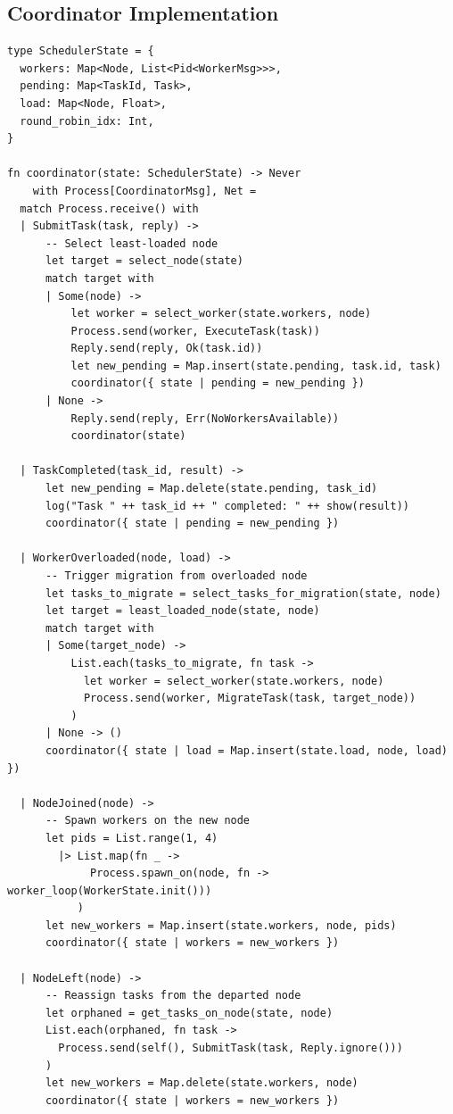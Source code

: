 \documentclass[11pt,a4paper]{article}
\begin{document}
\subsection{Coordinator Implementation}

\begin{lstlisting}
type SchedulerState = {
  workers: Map<Node, List<Pid<WorkerMsg>>>,
  pending: Map<TaskId, Task>,
  load: Map<Node, Float>,
  round_robin_idx: Int,
}

fn coordinator(state: SchedulerState) -> Never
    with Process[CoordinatorMsg], Net =
  match Process.receive() with
  | SubmitTask(task, reply) ->
      -- Select least-loaded node
      let target = select_node(state)
      match target with
      | Some(node) ->
          let worker = select_worker(state.workers, node)
          Process.send(worker, ExecuteTask(task))
          Reply.send(reply, Ok(task.id))
          let new_pending = Map.insert(state.pending, task.id, task)
          coordinator({ state | pending = new_pending })
      | None ->
          Reply.send(reply, Err(NoWorkersAvailable))
          coordinator(state)

  | TaskCompleted(task_id, result) ->
      let new_pending = Map.delete(state.pending, task_id)
      log("Task " ++ task_id ++ " completed: " ++ show(result))
      coordinator({ state | pending = new_pending })

  | WorkerOverloaded(node, load) ->
      -- Trigger migration from overloaded node
      let tasks_to_migrate = select_tasks_for_migration(state, node)
      let target = least_loaded_node(state, node)
      match target with
      | Some(target_node) ->
          List.each(tasks_to_migrate, fn task ->
            let worker = select_worker(state.workers, node)
            Process.send(worker, MigrateTask(task, target_node))
          )
      | None -> ()
      coordinator({ state | load = Map.insert(state.load, node, load) })

  | NodeJoined(node) ->
      -- Spawn workers on the new node
      let pids = List.range(1, 4)
        |> List.map(fn _ ->
             Process.spawn_on(node, fn -> worker_loop(WorkerState.init()))
           )
      let new_workers = Map.insert(state.workers, node, pids)
      coordinator({ state | workers = new_workers })

  | NodeLeft(node) ->
      -- Reassign tasks from the departed node
      let orphaned = get_tasks_on_node(state, node)
      List.each(orphaned, fn task ->
        Process.send(self(), SubmitTask(task, Reply.ignore()))
      )
      let new_workers = Map.delete(state.workers, node)
      coordinator({ state | workers = new_workers })
\end{lstlisting}
\end{document}
